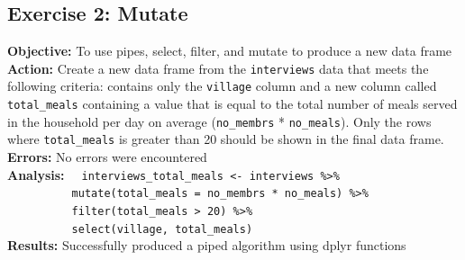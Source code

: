 \documentclass{article}
\begin{document}
\subsection{Exercise 2: Mutate}
\textbf{Objective:} To use pipes, select, filter, and mutate to produce a new data frame\\
\textbf{Action:} Create a new data frame from the \texttt{interviews} data that meets the following criteria: contains only the \texttt{village} column and a new column called \texttt{total\_meals} containing a value that is equal to the total number of meals served in the household per day on average (\texttt{no\_membrs} * \texttt{no\_meals}). Only the rows where \texttt{total\_meals} is greater than 20 should be shown in the final data frame.\\
\textbf{Errors:} No errors were encountered\\
\textbf{Analysis:}
\newpage
    \verb|  interviews_total_meals <- interviews %>%|\\
    \verb|          mutate(total_meals = no_membrs * no_meals) %>%|\\
    \verb|          filter(total_meals > 20) %>%|\\
    \verb|          select(village, total_meals)|\\
\textbf{Results:} Successfully produced a piped algorithm using dplyr functions
\end{document}
